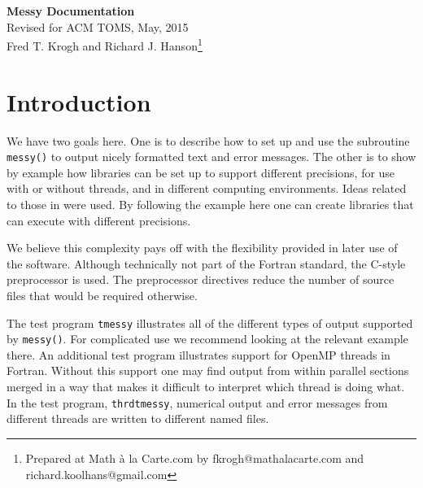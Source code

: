 \documentclass[12pt]{article}
\begin{document}
\pagestyle{fred}
\thispagestyle{empty}
\begin{center}
  {\LARGE \bf Messy Documentation}
  \\[10pt]
  {\large Revised for ACM TOMS, May, 2015\\[5pt]
    Fred T. Krogh and Richard J. Hanson\footnote{Prepared at Math \`a la
      Carte.com by fkrogh@mathalacarte.com and
      richard.koolhans@gmail.com}\vspace{10pt}}
\end{center}

\begin{abstract}
  This document gives more information on the testing and use of the code
  described in \cite{Krogh:2014:FMP} plus many more details on the packaging.
  Two test drivers illustrates the use of several ways of using the Fortran
  code.  The first code shows use with a single thread and the second shows use
  with two threads.  Library versions are created for single, double and
  quadruple floating point data formats.
\end{abstract}

\tableofcontents


\section{Introduction}
\label{sec:introduction}
We have two goals here.  One is to describe how to set up and use the subroutine
{\tt messy()} to output nicely formatted text and error messages.  The other is to
show by example how libraries can be set up to support different precisions, for
use with or without threads, and in different computing environments.  Ideas
related to those in \cite{Snyder:1997:PMT} were used.  By following the example
here one can create libraries that can execute with different precisions.

We believe this complexity pays off
with the flexibility provided in later use of the software. Although technically
not part of the Fortran standard, the C-style preprocessor is used.  The
preprocessor directives reduce the number of  source files that would
be required otherwise.

The test program {\tt tmessy} illustrates all of the different types of output
supported by {\tt messy()}.  For complicated use we recommend looking at the
relevant example there.  An additional test program illustrates support for
OpenMP threads in Fortran.  Without this support one may find output from within
parallel sections merged in a way that makes it difficult to interpret which
thread is doing what.  In the test program, {\tt thrdtmessy}, numerical output and
error messages from different threads are written to different named files.
\end{document}
